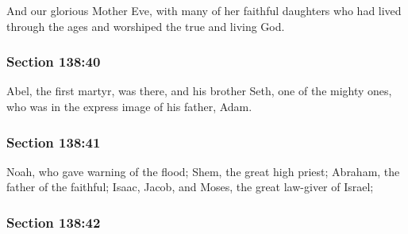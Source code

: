 		And our glorious Mother Eve, with many of her faithful daughters who had lived through the ages and worshiped the true and living God.


	\subsubsection{Section 138:40} %
		\label{DC138-40}

		Abel, the first martyr, was there, and his brother Seth, one of the mighty ones, who was in the express image of his father, Adam.


	\subsubsection{Section 138:41} %
		\label{DC138-41}

		Noah, who gave warning of the flood; Shem, the great high priest; Abraham, the father of the faithful; Isaac, Jacob, and Moses, the great law-giver of Israel;


	\subsubsection{Section 138:42} %
		\label{DC138-42}

